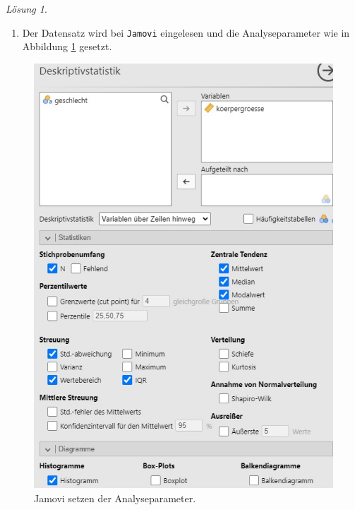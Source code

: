 \documentclass[
]{book}
\providecommand{\tightlist}{%
  \setlength{\itemsep}{0pt}\setlength{\parskip}{0pt}}
\theoremstyle{definition}
\theoremstyle{definition}
\theoremstyle{definition}
\theoremstyle{definition}
\theoremstyle{remark}
\newtheorem*{solution}{Lösung}
\begin{document}
\begin{solution}
\leavevmode

\begin{enumerate}
\def\labelenumi{(\alph{enumi})}
\tightlist
\item
  Der Datensatz wird bei \texttt{Jamovi} eingelesen und die Analyseparameter wie in Abbildung \ref{fig:sol-koerpergroesse-sex-input-a} gesetzt.
\end{enumerate}

\begin{figure}

{\centering \includegraphics[width=1\linewidth]{figures/02-exr-koerpergroesse-sex-jmv-input-a} 

}

\caption{Jamovi setzen der Analyseparameter.}\label{fig:sol-koerpergroesse-sex-input-a}
\end{figure}


\end{solution}
\end{document}
